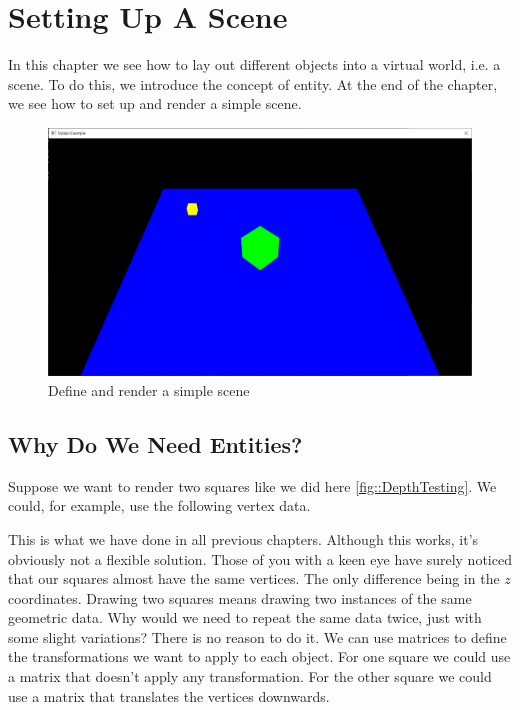 \chapter{Setting Up A Scene}
\label{chap:Scene}

In this chapter we see how to lay out different objects into a virtual
world, i.e. a scene.
To do this, we introduce the concept of entity.
At the end of the chapter, we see how to set up and render a
simple scene.

\begin{figure}[ht]
    \centering
    \includegraphics[scale=0.20]{images/ChScene/SimpleScene.png}
    \caption{Define and render a simple scene}
    \label{fig::SimpleScene}
\end{figure}

\section{Why Do We Need Entities?}

Suppose we want to render two squares like we did here \ref{fig::DepthTesting}.
We could, for example, use the following vertex data.

\begin{minipage}{\linewidth}{\noindent}
    
\end{minipage}

This is what we have done in all previous chapters.
Although this works, it's obviously not a flexible solution.
Those of you with a keen eye have surely noticed
that our squares almost have the same vertices.
The only difference being in the $z$ coordinates.
Drawing two squares means drawing two instances of the same geometric data.
Why would we need to repeat the same data twice, just with some slight variations?
There is no reason to do it.
We can use matrices to define the transformations we want to apply to each object.
For one square we could use a matrix that doesn't apply any transformation.
For the other square we could use a matrix that translates the vertices downwards.

